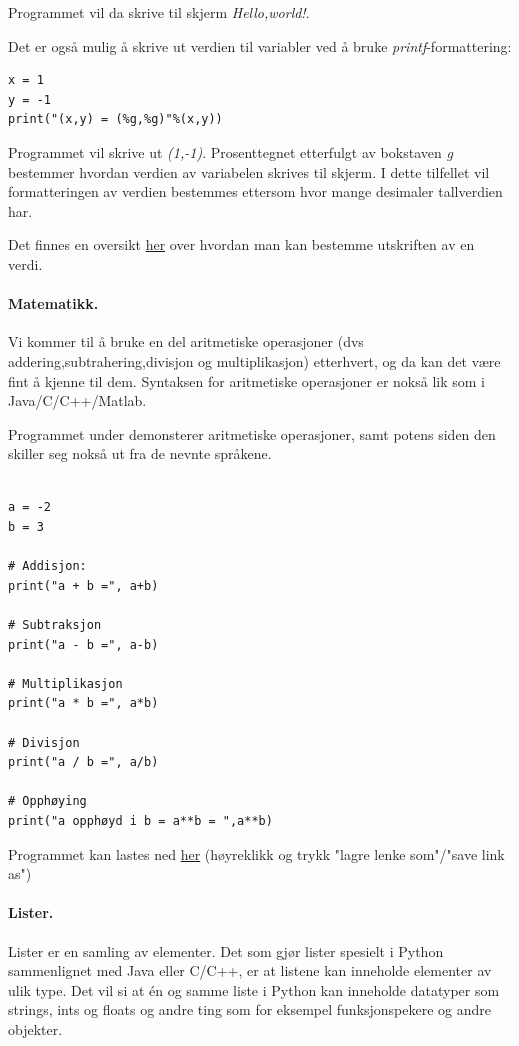 \documentclass[%
oneside,                 %
final,                   %
10pt]{article}
\begin{document}
Programmet vil da skrive til skjerm \emph{Hello,world!}.

Det er også mulig å skrive ut verdien til variabler ved å bruke \emph{printf}-formattering:

\begin{verbatim}
x = 1
y = -1
print("(x,y) = (%g,%g)"%(x,y))
\end{verbatim}

Programmet vil skrive ut \emph{(1,-1)}. Prosenttegnet etterfulgt av bokstaven \emph{g} bestemmer hvordan verdien av variabelen skrives til skjerm.
I dette tilfellet vil formatteringen av verdien bestemmes ettersom hvor mange desimaler tallverdien har.

Det finnes en oversikt \href{{https://docs.python.org/2/library/stdtypes.html#string-formatting}}{her} over hvordan man kan bestemme utskriften av en verdi.


\paragraph{Matematikk.}
Vi kommer til å bruke en del aritmetiske operasjoner (dvs addering,subtrahering,divisjon og multiplikasjon) etterhvert, og da kan det være fint å kjenne til dem.
Syntaksen for aritmetiske operasjoner er nokså lik som i Java/C/C++/Matlab.


Programmet under demonsterer aritmetiske operasjoner, samt potens siden den skiller seg nokså ut fra de nevnte språkene.

\begin{verbatim}

a = -2
b = 3

# Addisjon:
print("a + b =", a+b)

# Subtraksjon
print("a - b =", a-b)

# Multiplikasjon
print("a * b =", a*b)

# Divisjon
print("a / b =", a/b)

# Opphøying
print("a opphøyd i b = a**b = ",a**b)
\end{verbatim}
Programmet kan lastes ned \href{{https://github.com/krisbhei/INF2310/raw/master/Programmering/Python/aritmetikk.py}}{her} (høyreklikk og trykk "lagre lenke som"/"save link as")

\paragraph{Lister.}
Lister er en samling av elementer. Det som gjør lister spesielt i Python sammenlignet med Java eller C/C++, er at listene kan inneholde elementer av ulik type.
Det vil si at én og samme liste i Python kan inneholde datatyper som strings, ints og floats og andre ting som for eksempel funksjonspekere og andre objekter.
\end{document}
